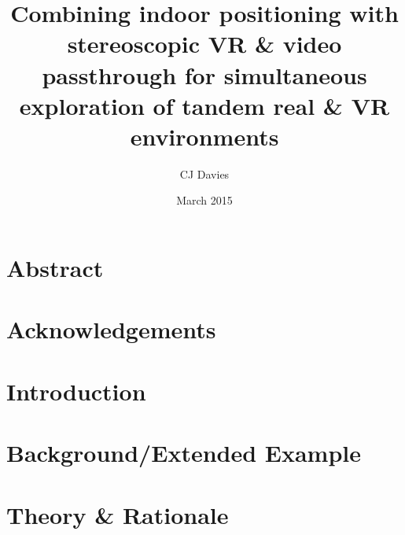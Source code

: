 \documentclass{report}
\begin{document}

\title{Combining indoor positioning with stereoscopic VR \& video passthrough for simultaneous exploration of tandem real \& VR environments}
\date{March 2015}
\author{CJ Davies}
\maketitle


\chapter*{Abstract}



\chapter*{Acknowledgements}



\tableofcontents


\chapter{Introduction}



\chapter{Background/Extended Example}



\chapter{Theory \& Rationale}

\graphicspath{ {03/images/} }

\end{document}

